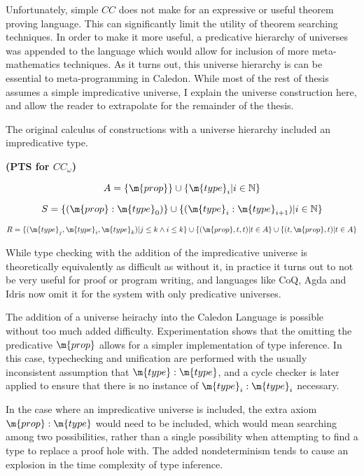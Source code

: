 Unfortunately, simple $CC$ does not make for an expressive or useful theorem proving language.  
This can significantly limit the utility of theorem searching techniques.  
In order to make it more useful, a predicative hierarchy of universes 
was appended to the language which would allow for inclusion of more meta-mathematics techniques.
As it turns out, this universe hierarchy is can be essential to meta-programming in Caledon.  
While most of the rest of thesis assumes a simple impredicative universe, I explain the 
universe construction here, and allow the reader to extrapolate for the remainder of the thesis.

The original calculus of constructions with a universe hierarchy included an impredicative type.  

\begin{definition}
\textbf{(PTS for $CC_\omega$)}

\[
A = \{ \m{prop} \} \cup \{ \m{type}_i | i \in \mathbb{N} \}
\]

\[
S =   \{ (\m{prop} : \m{type}_0 ) \}
 \cup \{ (\m{type}_i : \m{type}_{i+1} ) | i \in \mathbb{N} \}
\]

\[ 
R = \{ (\m{type}_j,\m{type}_i,\m{type}_k) | j \leq k \wedge i \leq k \}
\cup \{ (\m{prop},t,t) | t \in A \}
\cup \{ (t,\m{prop},t) | t \in A \}
\]

\label{coc:utypes}
\end{definition}

While type checking with the addition of the impredicative universe is theoretically equivalently as difficult 
as without it, in practice it turns out to not be very useful for proof or program writing, and 
languages like CoQ, Agda and Idris now omit it for the system with only predicative universes.

The addition of a universe heirachy into the Caledon Language is possible without too much added difficulty. 
Experimentation shows that the omitting the predicative $\m{prop}$ allows for a simpler implementation of type inference.
In this case, typechecking and unification are performed with the usually inconsistent assumption that
$\m{type} : \m{type}$, and a cycle checker is later applied to ensure that there is no instance of 
$\m{type}_i : \m{type}_i$ necessary.  

In the case where an impredicative universe is included, the extra axiom $\m{prop} : \m{type}$ would
need to be included, which would mean searching among two possibilities, rather than a single possibility 
when attempting to find a type to replace a proof hole with. 
The added nondeterminism tends to cause an explosion in the time complexity of type inference.
